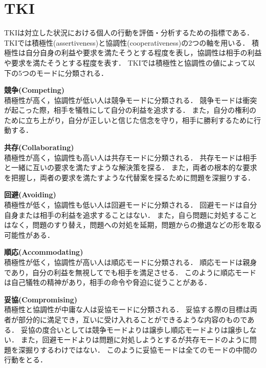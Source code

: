 \section{TKI}
\label{sec:tki}
TKIは対立した状況における個人の行動を評価・分析するための指標である\cite{tki}．
TKIでは積極性(assertiveness)と協調性(cooperativeness)の2つの軸を用いる．
積極性は自分自身の利益や要求を満たそうとする程度を表し，協調性は相手の利益や要求を満たそうとする程度を表す．
TKIでは積極性と協調性の値によって以下の5つのモードに分類される．
\begin{description}
    \item{\textbf{競争(Competing)}}\mbox{}\\
    積極性が高く，協調性が低い人は競争モードに分類される．
    競争モードは衝突が起こった際，相手を犠牲にして自分の利益を追求する．
    また，自分の権利のために立ち上がり，自分が正しいと信じた信念を守り，相手に勝利するために行動する．
    \item{\textbf{共存(Collaborating)}}\mbox{}\\
    積極性が高く，協調性も高い人は共存モードに分類される．
    共存モードは相手と一緒に互いの要求を満たすような解決策を探る．
    また，両者の根本的な要求を把握し，両者の要求を満たすような代替案を探るために問題を深掘りする．
    \item{\textbf{回避(Avoiding)}}\mbox{}\\
    積極性が低く，協調性も低い人は回避モードに分類される．
    回避モードは自分自身または相手の利益を追求することはない．
    また，自ら問題に対処することはなく，問題のすり替え，問題への対処を延期，問題からの撤退などの形を取る可能性がある．
    \item{\textbf{順応(Accommodating)}}\mbox{}\\
    積極性が低く，協調性が高い人は順応モードに分類される．
    順応モードは親身であり，自分の利益を無視してでも相手を満足させる．
    このように順応モードは自己犠牲の精神があり，相手の命令や脅迫に従うことがある．
    \item{\textbf{妥協(Compromising)}}\mbox{}\\
    積極性と協調性が中庸な人は妥協モードに分類される．
    妥協する際の目標は両者が部分的に満足でき，互いに受け入れることができるような内容のものである．
    妥協の度合いとしては競争モードよりは譲歩し順応モードよりは譲歩しない．
    また，回避モードよりは問題に対処しようとするが共存モードのように問題を深掘りするわけではない．
    このように妥協モードは全てのモードの中間の行動をとる．
\end{description}

